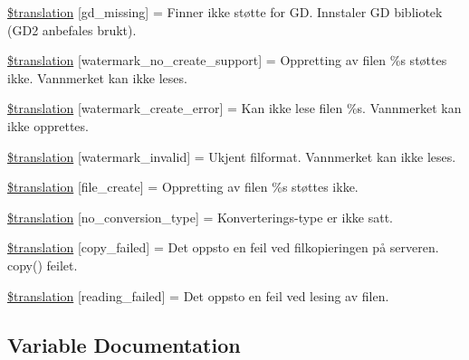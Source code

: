 \begin{DoxyCompactItemize}
\item 
\hyperlink{class_8upload_8no___n_o_8php_a7f3dfcc0db4bbc0f2e7210c439798e56}{\$translation} \mbox{[}\textquotesingle{}gd\+\_\+missing\textquotesingle{}\mbox{]} = \textquotesingle{}Finner ikke støtte for G\+D. Innstaler G\+D bibliotek (G\+D2 anbefales brukt).\textquotesingle{}
\item 
\hyperlink{class_8upload_8no___n_o_8php_a82d5853430ab72dc1f9799ec36144cc6}{\$translation} \mbox{[}\textquotesingle{}watermark\+\_\+no\+\_\+create\+\_\+support\textquotesingle{}\mbox{]} = \textquotesingle{}Oppretting av filen \%s støttes ikke. Vannmerket kan ikke leses.\textquotesingle{}
\item 
\hyperlink{class_8upload_8no___n_o_8php_aabca0b65dadbc6184415c16375f284ca}{\$translation} \mbox{[}\textquotesingle{}watermark\+\_\+create\+\_\+error\textquotesingle{}\mbox{]} = \textquotesingle{}Kan ikke lese filen \%s. Vannmerket kan ikke opprettes.\textquotesingle{}
\item 
\hyperlink{class_8upload_8no___n_o_8php_ac336e7a5701e47ba4a05e9e498a3cc44}{\$translation} \mbox{[}\textquotesingle{}watermark\+\_\+invalid\textquotesingle{}\mbox{]} = \textquotesingle{}Ukjent filformat. Vannmerket kan ikke leses.\textquotesingle{}
\item 
\hyperlink{class_8upload_8no___n_o_8php_a1ecb4673e4fb69e06b3f20b65cecf30a}{\$translation} \mbox{[}\textquotesingle{}file\+\_\+create\textquotesingle{}\mbox{]} = \textquotesingle{}Oppretting av filen \%s støttes ikke.\textquotesingle{}
\item 
\hyperlink{class_8upload_8no___n_o_8php_a4712d7ec28e9a7f17eb3338af2358363}{\$translation} \mbox{[}\textquotesingle{}no\+\_\+conversion\+\_\+type\textquotesingle{}\mbox{]} = \textquotesingle{}Konverterings-\/type er ikke satt.\textquotesingle{}
\item 
\hyperlink{class_8upload_8no___n_o_8php_a783c9358bcf54a054545b50098bc679b}{\$translation} \mbox{[}\textquotesingle{}copy\+\_\+failed\textquotesingle{}\mbox{]} = \textquotesingle{}Det oppsto en feil ved filkopieringen på serveren. copy() feilet.\textquotesingle{}
\item 
\hyperlink{class_8upload_8no___n_o_8php_a01bea14c9fd5f353f62db44beabfcd42}{\$translation} \mbox{[}\textquotesingle{}reading\+\_\+failed\textquotesingle{}\mbox{]} = \textquotesingle{}Det oppsto en feil ved lesing av filen.\textquotesingle{}
\end{DoxyCompactItemize}


\subsection{Variable Documentation}
\hypertarget{class_8upload_8no___n_o_8php_a1f198d410fecc3871ebdd468d343a5e3}{}
